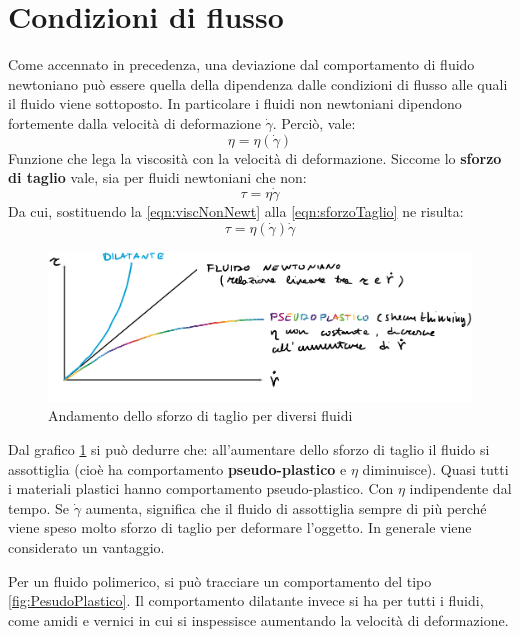 \section{Condizioni di flusso}
Come accennato in precedenza, una deviazione dal comportamento di fluido newtoniano può essere quella della dipendenza dalle condizioni di flusso alle quali il fluido viene sottoposto.
In particolare i fluidi non newtoniani dipendono fortemente dalla velocità di deformazione $\dot{\gamma}$.
Perciò, vale:
\begin{equation}
\eta = \eta(\dot{\gamma})
\label{eqn:viscNonNewt}
\end{equation}
Funzione che lega la viscosità con la velocità di deformazione.
Siccome lo \textbf{sforzo di taglio} vale, sia per fluidi newtoniani che non:
\begin{equation}
\tau = \eta \dot{\gamma}
\label{eqn:sforzoTaglio}
\end{equation}
Da cui, sostituendo la \eqref{eqn:viscNonNewt} alla \eqref{eqn:sforzoTaglio} ne risulta:
\begin{equation}
\tau = \eta(\dot{\gamma}) \dot{\gamma}
\label{eqn:taglioNonNewt}
\end{equation}

\begin{figure}
\centering
\includegraphics[width = \textwidth]{gfx/TaglioNonNewt}
\caption{Andamento dello sforzo di taglio per diversi fluidi}
\label{fig:TaglioNonNewt}
\end{figure}

Dal grafico \ref{fig:TaglioNonNewt} si può dedurre che:
all'aumentare dello sforzo di taglio il fluido si assottiglia (cioè ha comportamento \textbf{pseudo-plastico} e $\eta$ diminuisce).
Quasi tutti i materiali plastici hanno comportamento pseudo-plastico. Con $\eta$ indipendente dal tempo.
Se $\dot{\gamma}$ aumenta, significa che il fluido di assottiglia sempre di più perché viene speso molto sforzo di taglio per deformare l'oggetto. In generale viene considerato un vantaggio.

Per un fluido polimerico, si può tracciare un comportamento del tipo \ref{fig:PesudoPlastico}.
Il comportamento dilatante invece si ha per tutti i fluidi, come amidi e vernici in cui si inspessisce aumentando la velocità di deformazione.

